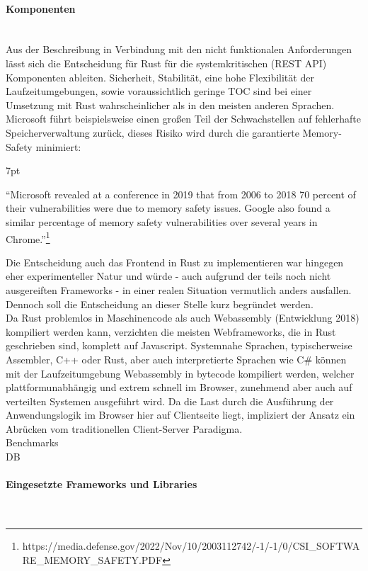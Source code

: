 \documentclass[notitlepage, hidelinks]{article}
\newenvironment{formal}{%
  \def\FrameCommand{%
    \hspace{1pt}%
    {\color{black}\vrule width 2pt}%
    {\color{formalshade}\vrule width 4pt}%
    \colorbox{formalshade}%
  }%
  \MakeFramed{\advance\hsize-\width\FrameRestore}%
  \noindent\hspace{-4.55pt}%
  \begin{adjustwidth}{}{7pt}%
  \vspace{2pt}\vspace{2pt}%
}
{%
  \vspace{2pt}\end{adjustwidth}\endMakeFramed%
}
\begin{document}
\paragraph{Komponenten} \mbox{} \\
Aus der Beschreibung in Verbindung mit den nicht funktionalen Anforderungen lässt sich die Entscheidung für Rust für die systemkritischen (REST API) Komponenten ableiten. Sicherheit, Stabilität, eine hohe Flexibilität der Laufzeitumgebungen, sowie voraussichtlich geringe TOC sind bei einer Umsetzung mit Rust wahrscheinlicher als in den meisten anderen Sprachen. Microsoft führt beispielsweise einen großen Teil der Schwachstellen auf fehlerhafte Speicherverwaltung zurück, dieses Risiko wird durch die garantierte Memory-Safety minimiert:
\begin{formal}
``Microsoft revealed at a conference in 2019 that from 2006 to 2018 70 percent of their vulnerabilities were due to memory safety issues. Google also found a similar percentage of memory safety vulnerabilities over several years in Chrome.''\footnote{https://media.defense.gov/2022/Nov/10/2003112742/-1/-1/0/CSI\_SOFTWARE\_MEMORY\_SAFETY.PDF}
\end{formal}

Die Entscheidung auch das Frontend in Rust zu implementieren war hingegen eher experimenteller Natur und würde - auch aufgrund der teils noch nicht ausgereiften Frameworks - in einer realen Situation vermutlich anders ausfallen. Dennoch soll die Entscheidung an dieser Stelle kurz begründet werden. \\

Da Rust problemlos in Maschinencode als auch Webassembly (Entwicklung 2018) kompiliert werden kann, verzichten die meisten Webframeworks, die in Rust geschrieben sind, komplett auf Javascript. Systemnahe Sprachen, typischerweise Assembler, C++ oder Rust, aber auch interpretierte Sprachen wie C\# können mit der Laufzeitumgebung Webassembly in bytecode kompiliert werden, welcher plattformunabhängig und extrem schnell im Browser, zunehmend aber auch auf verteilten Systemen ausgeführt wird. Da die Last durch die Ausführung der Anwendungslogik im Browser hier auf Clientseite liegt, impliziert der Ansatz ein Abrücken vom traditionellen Client-Server Paradigma. \\
Benchmarks \\

DB

\paragraph{Eingesetzte Frameworks und Libraries} \mbox{} \\
\end{document}
